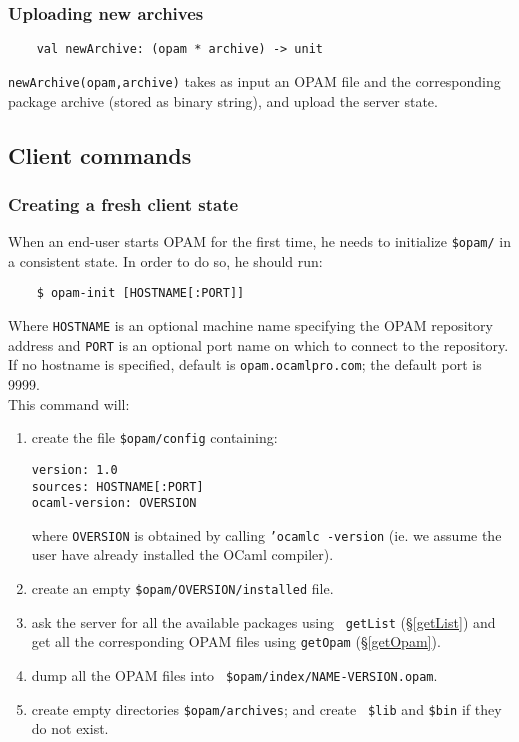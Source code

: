 \documentclass[a4paper,11pt]{article}
\begin{document}
\subsubsection{Uploading new archives}
\label{newArchive}

\begin{verbatim}
    val newArchive: (opam * archive) -> unit
\end{verbatim}

{\tt newArchive(opam,archive)} takes as input an OPAM file and the
corresponding package archive (stored as binary string), and upload
the server state.

\subsection{Client commands}

\subsubsection{Creating a fresh client state}

When an end-user starts OPAM for the first time, he needs to
initialize {\tt \$opam/} in a consistent state. In order to do so, he
should run:

\begin{verbatim}
    $ opam-init [HOSTNAME[:PORT]]
\end{verbatim}

Where {\tt HOSTNAME} is an optional machine name specifying the OPAM
repository address and {\tt PORT} is an optional port name on which to
connect to the repository. If no hostname is specified, default is
{\tt opam.ocamlpro.com}; the default port is 9999. \\

This command will:

\begin{enumerate}

\item create the file {\tt \$opam/config} containing:

\begin{verbatim}
version: 1.0
sources: HOSTNAME[:PORT]
ocaml-version: OVERSION
\end{verbatim}

where {\tt OVERSION} is obtained by calling {\tt 'ocamlc -version}
(ie. we assume the user have already installed the OCaml compiler).

\item create an empty {\tt \$opam/OVERSION/installed} file.

\item ask the server for all the available packages using {\tt
  getList} (\S\ref{getList}) and get all the corresponding OPAM files
  using {\tt getOpam} (\S\ref{getOpam}).

\item dump all the OPAM files into {\tt
  \$opam/index/NAME-VERSION.opam}.

\item create empty directories {\tt \$opam/archives}; and create {\tt
  \$lib} and {\tt \$bin} if they do not exist.

\end{enumerate}
\end{document}
